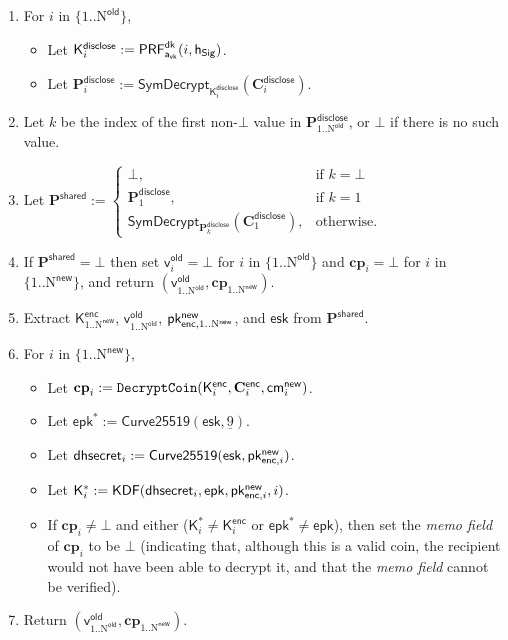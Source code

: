 \documentclass{article}
\newcommand{\term}[1]{\textsl{#1}\xspace}
\newcommand{\memo}{\term{memo field}}
\newcommand{\DiscloseKey}{\mathsf{a_{vk}}}
\newcommand{\enc}{\mathsf{enc}}
\newcommand{\disclose}{\mathsf{disclose}}
\newcommand{\shared}{\mathsf{shared}}
\newcommand{\DHSecret}[1]{\mathsf{dhsecret}_{#1}}
\newcommand{\EphemeralPublic}{\mathsf{epk}}
\newcommand{\EphemeralPublicCompare}{\mathsf{epk}^*}
\newcommand{\EphemeralPrivate}{\mathsf{esk}}
\newcommand{\TransmitPublicNew}[1]{\mathsf{pk^{new}_{\enc,\mathnormal{#1}}}}
\newcommand{\CoinPlaintext}[1]{\mathbf{cp}_{#1}}
\newcommand{\CurveMultiply}{\mathsf{Curve25519}}
\newcommand{\CurveBase}{\underline{9}}
\newcommand{\DecryptCoin}{\mathtt{DecryptCoin}}
\newcommand{\Plaintext}{\mathbf{P}}
\newcommand{\Ciphertext}{\mathbf{C}}
\newcommand{\Key}{\mathsf{K}}
\newcommand{\TransmitCiphertext}[1]{\Ciphertext^\enc_{#1}}
\newcommand{\TransmitKey}[1]{\Key^\enc_{#1}}
\newcommand{\TransmitKeyCompare}[1]{\Key^*_{#1}}
\newcommand{\DerivedKey}[1]{\Key^\disclose_{#1}}
\newcommand{\DisclosePlaintext}[1]{\Plaintext^\disclose_{#1}}
\newcommand{\DiscloseCiphertext}[1]{\Ciphertext^\disclose_{#1}}
\newcommand{\SharedPlaintext}{\Plaintext^\shared}
\newcommand{\KDF}{\mathsf{KDF}}
\newcommand{\SymDecrypt}[1]{\mathsf{SymDecrypt}_{#1}}
\newcommand{\PRF}[2]{\mathsf{{PRF}^{#2}_\mathnormal{#1}}}
\newcommand{\PRFdk}[1]{\PRF{#1}{dk}}
\newcommand{\cmNew}[1]{\mathsf{{cm}^{new}_\mathnormal{#1}}}
\newcommand{\hSig}{\mathsf{h_{Sig}}}
\newcommand{\NOld}{\mathrm{N}^\mathsf{old}}
\newcommand{\NNew}{\mathrm{N}^\mathsf{new}}
\newcommand{\vOld}[1]{\mathsf{v}_{#1}^\mathsf{old}}
\begin{document}
{\begin{enumerate}
  \item For $i$ in $\{1..\NOld\}$,
    \begin{itemize}
      \item Let $\DerivedKey{i} := \PRFdk{\DiscloseKey{}}(i, \hSig)$.
      \item Let $\DisclosePlaintext{i} := \SymDecrypt{\DerivedKey{i}}(\DiscloseCiphertext{i})$.
    \end{itemize}
  \item Let $k$ be the index of the first non-$\bot$ value in $\DisclosePlaintext{1..\NOld}$,
        or $\bot$ if there is no such value.
  \item Let $\SharedPlaintext := \begin{cases}
          \bot,                  & \text{if $k = \bot$} \\ 
          \DisclosePlaintext{1}, & \text{if $k = 1$} \\
          \SymDecrypt{\DisclosePlaintext{k}}(\DiscloseCiphertext{1}), & \text{otherwise.}
        \end{cases}$
  \item If $\SharedPlaintext = \bot$ then
set $\vOld{i} = \bot$ for $i$ in $\{1..\NOld\}$ and
$\CoinPlaintext{i} = \bot$ for $i$ in $\{1..\NNew\}$, and return
$(\vOld{\mathrm{1}..\NOld}, \CoinPlaintext{\mathrm{1}..\NNew})$.
  \item Extract $\TransmitKey{1..\NNew}$, $\vOld{\mathrm{1}..\NOld}$,
$\TransmitPublicNew{\mathrm{1}..\NNew}$, and $\EphemeralPrivate$ from $\SharedPlaintext$.
  \item For $i$ in $\{1..\NNew\}$,
    \begin{itemize}
      \item Let $\CoinPlaintext{i} :=
\DecryptCoin(\TransmitKey{i}, \TransmitCiphertext{i}, \cmNew{i})$.
      \item Let $\EphemeralPublicCompare := \CurveMultiply(\EphemeralPrivate, \CurveBase)$.
      \item Let $\DHSecret{i} := \CurveMultiply(\EphemeralPrivate, \TransmitPublicNew{i})$.
      \item Let $\TransmitKeyCompare{i} := \KDF(\DHSecret{i}, \EphemeralPublic,
\TransmitPublicNew{i}, i)$.
      \item If $\CoinPlaintext{i} \neq \bot$ and either
($\TransmitKeyCompare{i} \neq \TransmitKey{i}$ or
$\EphemeralPublicCompare \neq \EphemeralPublic$), then set the \memo
of $\CoinPlaintext{i}$ to be $\bot$ (indicating that, although this is a valid
coin, the recipient would not have been able to decrypt it, and that the \memo
cannot be verified).
    \end{itemize}
  \item Return $(\vOld{\mathrm{1}..\NOld}, \CoinPlaintext{\mathrm{1}..\NNew})$.
\end{enumerate}

}
\end{document}
